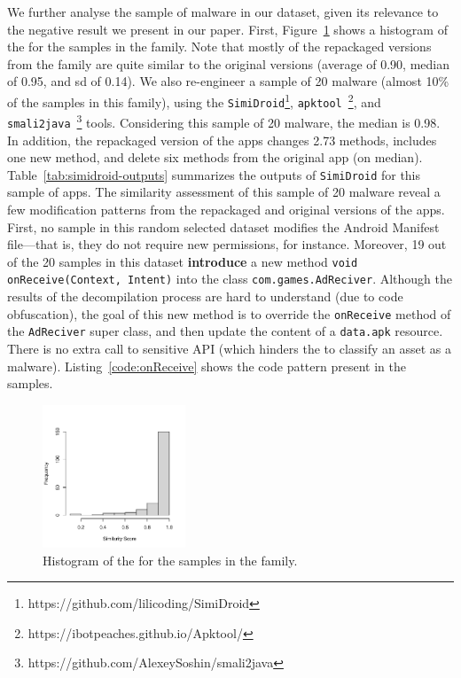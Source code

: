 We further analyse the sample of \gps malware in our dataset, given its
relevance to the negative result we present in our paper. First,
Figure~\ref{fig:hist-gappusin} shows a histogram of the \sscore for the samples
in the \gps family. Note that mostly of the repackaged versions from the
\gps family are quite similar to the original versions (average \sscore
of 0.90, median \sscore of 0.95, and sd of 0.14). We also re-engineer
a sample of 20 \gps malware (almost 10\% of the samples in this
family), using the \texttt{SimiDroid}\footnote{https://github.com/lilicoding/SimiDroid},
\texttt{apktool}~\footnote{https://ibotpeaches.github.io/Apktool/},
and \texttt{smali2java}~\footnote{https://github.com/AlexeySoshin/smali2java} tools.
Considering this sample of 20 \gps malware, the median \sscore is 0.98. In addition,
the repackaged version of the apps changes 2.73 methods, includes one new method,
and delete six methods from the original app (on median). Table~\ref{tab:simidroid-outputs} summarizes
the outputs of \texttt{SimiDroid} for this sample of \gps apps. The similarity assessment
of this sample of 20 \gps malware reveal a few modification patterns from the repackaged and
original versions of the apps. First, no sample in this random selected \gps dataset
modifies the Android Manifest file---that is, they do not require new permissions, for instance.
Moreover, 19 out of the 20 samples in this dataset  {\bf introduce} a new
method \texttt{void onReceive(Context, Intent)}
into the class \texttt{com.games.AdReciver}. Although the results of the
decompilation process are hard to understand (due to code obfuscation),
the goal of this new method is to override the \texttt{onReceive} method
of the \texttt{AdReciver} super class, and then update the content of a \texttt{data.apk}
resource. There is no extra call to sensitive API (which hinders the
\mas to classify an asset as a malware). Listing~\ref{code:onReceive} shows
the code pattern present in the samples. 

\begin{figure}
\begin{center}
    \includegraphics[width=0.38\textwidth]{images/gappusin-1.pdf}
  \end{center}
  \caption{Histogram of the \sscore for the samples in the \gps family.}
  \label{fig:hist-gappusin}
\end{figure}  

